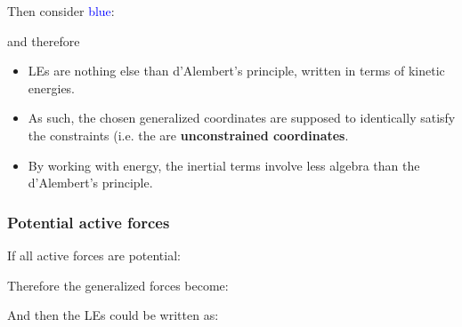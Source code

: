 \documentclass[10pt,a4paper]{scrartcl}
\begin{document}
\begin{multicols*}{2}
Then consider \textcolor{blue}{blue}:


and therefore



\begin{itemize}
\item LEs are nothing else than d'Alembert's principle, written in terms of kinetic energies.
\item As such, the chosen generalized coordinates are supposed to identically satisfy the constraints (i.e. the are \textbf{unconstrained coordinates}.
\item By working with energy, the inertial terms involve less algebra than the d'Alembert's principle.
\end{itemize}

\subsubsection{Potential active forces}

If all active forces are potential:


Therefore the generalized forces become:


And then the LEs could be written as:



\end{multicols*}
\end{document}
